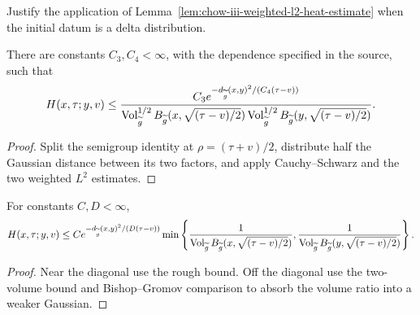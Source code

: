 \begin{claim}
\label{clm:chow-iii-weighted-l2-delta-source-exercise}
Justify the application of Lemma~\ref{lem:chow-iii-weighted-l2-heat-estimate}
when the initial datum is a delta distribution.
\end{claim}

\begin{theorem}
\label{thm:chow-iii-evolving-heat-kernel-gaussian-upper-bound}
There are constants \(C_3,C_4<\infty\), with the dependence specified in the
source, such that
\[
 H(x,\tau;y,v)\le
 \frac{C_3e^{-d_{\widetilde g}(x,y)^2/(C_4(\tau-v))}}
 {\operatorname{Vol}_{\widetilde g}^{1/2}B_{\widetilde g}(x,\sqrt{(\tau-v)/2})
  \operatorname{Vol}_{\widetilde g}^{1/2}B_{\widetilde g}(y,\sqrt{(\tau-v)/2})}.
\]
\end{theorem}
\begin{proof}
Split the semigroup identity at \(\rho=(\tau+v)/2\), distribute half the
Gaussian distance between its two factors, and apply Cauchy--Schwarz and the
two weighted \(L^2\) estimates.
\end{proof}

\begin{corollary}
\label{cor:chow-iii-evolving-heat-kernel-one-volume-upper-bound}
For constants \(C,D<\infty\),
\[
 H(x,\tau;y,v)\le Ce^{-d_{\widetilde g}(x,y)^2/(D(\tau-v))}
 \min\left\{
 \frac1{\operatorname{Vol}_{\widetilde g}B_{\widetilde g}(x,\sqrt{(\tau-v)/2})},
 \frac1{\operatorname{Vol}_{\widetilde g}B_{\widetilde g}(y,\sqrt{(\tau-v)/2})}
 \right\}.
\]
\end{corollary}
\begin{proof}
Near the diagonal use the rough bound.  Off the diagonal use the two-volume
bound and Bishop--Gromov comparison to absorb the volume ratio into a weaker
Gaussian.
\end{proof}

